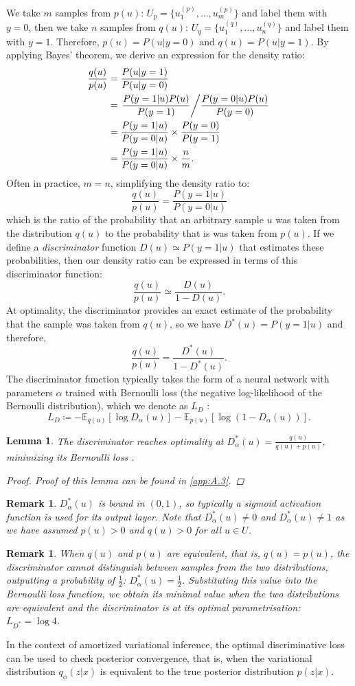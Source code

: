 \documentclass[honours,12pt]{unswthesis}
\newcommand{\E}{\mathbb{E}}
\newtheorem{lemma}[theorem]{Lemma}
\newtheorem{remark}[theorem]{Remark}
\numberwithin{equation}{section}
\theoremstyle{definition}
\begin{document}
We take $m$ samples from $p(u)$: $U_p=\{u_1^{(p)},\dots,u_m^{(p)}\}$
and label them with $y=0$, then we take $n$ samples from $q(u)$: $U_q=\{u_1^{(q)},\dots, u_n^{(q)}\}$ and label them with $y=1$. Therefore, $p(u)=P(u|y=0)$ and $q(u)=P(u|y=1)$. By applying Bayes' theorem, we derive an expression for the density ratio:
\begin{align*}
\frac{q(u)}{p(u)}&= \frac{P(u|y=1)}{P(u|y=0)}\\
&= \left.\frac{P(y=1|u)P(u)}{P(y=1)}\middle/ \frac{P(y=0|u)P(u)}{P(y=0)}\right.\\
&= \frac{P(y=1|u)}{P(y=0|u)}\times \frac{P(y=0)}{P(y=1)}\\
&= \frac{P(y=1|u)}{P(y=0|u)}\times \frac{n}{m}.
\end{align*}
Often in practice, $m=n$, simplifying the density ratio to:
\[\frac{q(u)}{p(u)}=\frac{P(y=1|u)}{P(y=0|u)}\]
which is the ratio of the probability that an arbitrary sample $u$ was taken from the distribution $q(u)$ to the probability that is was taken from $p(u)$. If we define a \textit{discriminator} function $D(u)\simeq P(y=1|u)$ that estimates these probabilities, then our density ratio can be expressed in terms of this discriminator function:
\[\frac{q(u)}{p(u)}\simeq \frac{D(u)}{1-D(u)}.\]
At optimality, the discriminator provides an exact estimate of the probability that the sample was taken from $q(u)$, so we have $D^*(u)=P(y=1|u)$ and therefore,
\[\frac{q(u)}{p(u)}=\frac{D^*(u)}{1-D^*(u)}.\]
The discriminator function typically takes the form of a neural network with parameters $\alpha$ trained with Bernoulli loss (the negative log-likelihood of the Bernoulli distribution), which we denote as $L_D$ \citep{sugiyama}:
\[L_D\coloneqq-\E_{q(u)}[\log D_\alpha(u)]-\E_{p(u)}[\log(1-D_\alpha(u))].\]
\begin{lemma}
The discriminator reaches optimality at $D^*_\alpha(u)=\frac{q(u)}{q(u)+p(u)}$, minimizing its Bernoulli loss \citep{gan}.
\begin{proof}
Proof of this lemma can be found in \autoref{app:A.3}.
\end{proof}
\end{lemma}
\begin{remark}\label{rem:4.1.2}
$D^*_\alpha(u)$ is bound in $(0,1)$, so typically a sigmoid activation function is used for its output layer. Note that $D^*_\alpha (u)\neq 0$ and $D^*_\alpha(u)\neq 1$ as we have assumed $p(u)>0$ and $q(u)>0$ for all $u\in U$.
\end{remark}
\begin{remark}\label{rem:4.1.3}
When $q(u)$ and $p(u)$ are equivalent, that is, $q(u)=p(u)$, the discriminator cannot distinguish between samples from the two distributions, outputting a probability of $\frac{1}{2}$: $D^*_\alpha(u)=\frac{1}{2}$. Substituting this value into the Bernoulli loss function, we obtain its minimal value when the two distributions are equivalent and the discriminator is at its optimal parametrisation: $L_{D^*}=\log 4$.
\end{remark}
In the context of amortized variational inference, the optimal discriminative loss can be used to check posterior convergence, that is, when the variational distribution $q_\phi(z|x)$ is equivalent to the true posterior distribution $p(z|x)$.
\end{document}
